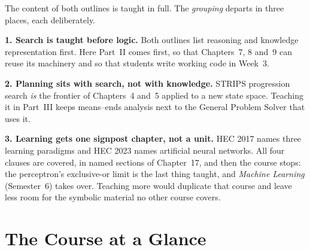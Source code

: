 \begin{conceptbox}
The content of both outlines is taught in full. The \emph{grouping} departs in
three places, each deliberately.

\smallskip
\textbf{1. Search is taught before logic.} Both outlines list reasoning and
knowledge representation first. Here Part~II comes first, so that Chapters~7, 8
and~9 can reuse its machinery and so that students write working code in Week~3.

\smallskip
\textbf{2. Planning sits with search, not with knowledge.} STRIPS progression
search \emph{is} the frontier of Chapters~4 and~5 applied to a new state space.
Teaching it in Part~III keeps means--ends analysis next to the General Problem
Solver that uses it.

\smallskip
\textbf{3. Learning gets one signpost chapter, not a unit.} HEC 2017 names three
learning paradigms and HEC 2023 names artificial neural networks. All four clauses
are covered, in named sections of Chapter~17, and then the course stops: the
perceptron's exclusive-or limit is the last thing taught, and \emph{Machine
Learning} (Semester~6) takes over. Teaching more would duplicate that course and
leave less room for the symbolic material no other course covers.
\end{conceptbox}

\newpage

\chapter*{The Course at a Glance}


